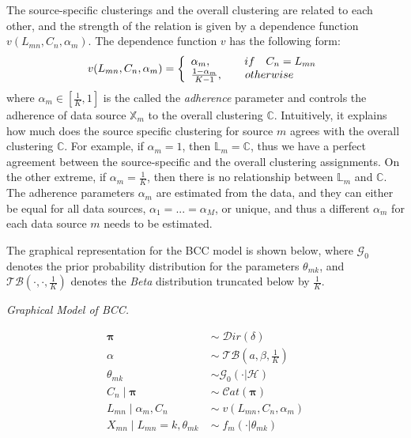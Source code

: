 The source-specific clusterings and the overall clustering are related to each other, and the strength of the relation is given by a dependence function $v(L_{mn}, C_{n}, \alpha_{m})$. The dependence function $v$ has the following form:
\begin{equation}
	v(L_{mn}, C_{n}, \alpha_{m}) = \left\{
	\begin{array}{l l}
		\alpha_{m},\quad \quad \quad if\quad C_{n} = L_{mn}\\
		\frac{1-\alpha_{m}}{K-1},\quad \quad otherwise
	\end{array}\right.
\end{equation}
where $\alpha_{m} \in [\frac{1}{K}, 1]$ is the called the \emph{adherence} parameter and controls the adherence of data source $\mathbb{X}_m$ to the overall clustering $\mathbb{C}$. Intuitively, it explains how much does the source specific clustering for source $m$ agrees with the overall clustering $\mathbb{C}$. For example, if $\alpha_{m} = 1$, then $\mathbb{L}_{m} = \mathbb{C}$, thus we have a perfect agreement between the source-specific and the overall clustering assignments. On the other extreme, if $\alpha_{m} = \frac{1}{K}$, then there is no relationship between $\mathbb{L}_{m}$ and $\mathbb{C}$. The adherence parameters $\alpha_{m}$ are estimated from the data, and they can either be equal for all data sources, \ie $\alpha_{1} = ... = \alpha_{M}$, or unique, and thus a different $\alpha_{m}$ for each data source $m$ needs to be estimated. 


The graphical representation for the BCC model is shown below, where $\mathcal{G}_{0}$ denotes the prior probability distribution for the parameters $\theta_{mk}$, and $\mathcal{TB}(\cdot, \cdot, \frac{1}{K})$ denotes the \emph{Beta} distribution truncated below by $\frac{1}{K}$.

\vspace*{5mm}
\begin{minipage}{0.5\textwidth}%
  \hfill
  \begin{center}
	
	\emph{Graphical Model of BCC.}
  \end{center}
\end{minipage}
\begin{minipage}{0.4\textwidth}%
  \begin{equation*}
  	\begin{aligned}
  		\mathbf{\pi} \; & \sim \; \mathcal{D}ir(\delta) \\
  		\alpha \; & \sim \; \mathcal{TB}(\mathit{a}, \beta, \frac{1}{K}) \\
  		\theta_{mk} \; & \sim \mathcal{G}_{0}(\cdot | \mathcal{H}) \\
  		C_{n} \mid \mathbf{\pi} \; & \sim \; \mathcal{C}at(\mathbf{\pi}) \\
  		L_{mn} \mid \alpha_{m}, C_{n} \; & \sim \; v(L_{mn}, C_{n}, \alpha_{m}) \\
  		X_{mn} \mid L_{mn}=k,\theta_{mk} \; & \sim \; f_{m}(\cdot | \theta_{mk}) 
  	\end{aligned} 
  \end{equation*} 
\end{minipage}
\vspace*{5mm}


